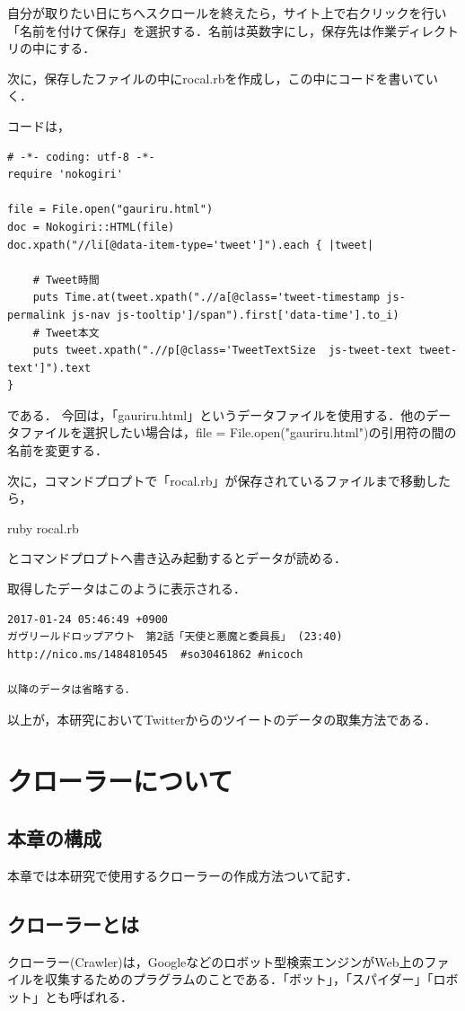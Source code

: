 自分が取りたい日にちへスクロールを終えたら，サイト上で右クリックを行い「名前を付けて保存」を選択する．名前は英数字にし，保存先は作業ディレクトリの中にする．

次に，保存したファイルの中にrocal.rbを作成し，この中にコードを書いていく．

コードは，
	\begin{verbatim}
# -*- coding: utf-8 -*-
require 'nokogiri'

file = File.open("gauriru.html")
doc = Nokogiri::HTML(file)
doc.xpath("//li[@data-item-type='tweet']").each { |tweet|

	# Tweet時間
	puts Time.at(tweet.xpath(".//a[@class='tweet-timestamp js-permalink js-nav js-tooltip']/span").first['data-time'].to_i)
	# Tweet本文
	puts tweet.xpath(".//p[@class='TweetTextSize  js-tweet-text tweet-text']").text
}

	\end{verbatim}
である．
今回は，「gauriru.html」というデータファイルを使用する．他のデータファイルを選択したい場合は，file = File.open("gauriru.html")の引用符の間の名前を変更する．

次に，コマンドプロプトで「rocal.rb」が保存されているファイルまで移動したら，

ruby rocal.rb

とコマンドプロプトへ書き込み起動するとデータが読める．

取得したデータはこのように表示される．
	\begin{verbatim}
2017-01-24 05:46:49 +0900
ガヴリールドロップアウト　第2話「天使と悪魔と委員長」 (23:40) http://nico.ms/1484810545  #so30461862 #nicoch

以降のデータは省略する．
	\end{verbatim}
以上が，本研究においてTwitterからのツイートのデータの取集方法である．

\chapter{クローラーについて}


\section{本章の構成}

本章では本研究で使用するクローラーの作成方法ついて記す．


\section{クローラーとは}
クローラー(Crawler)は，Googleなどのロボット型検索エンジンがWeb上のファイルを収集するためのプラグラムのことである．「ボット」，「スパイダー」「ロボット」とも呼ばれる．


